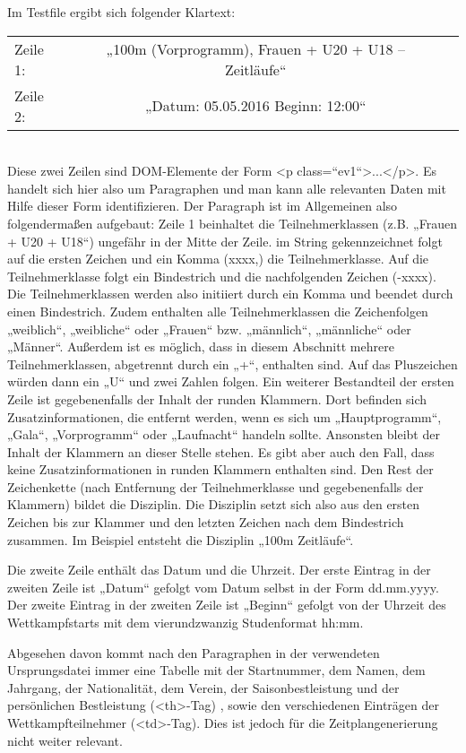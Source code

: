 {Im Testfile ergibt sich folgender Klartext:\\
\begin{tabular}{lcr}
Zeile 1: & „100m (Vorprogramm), Frauen + U20 + U18 – Zeitläufe“ \\
Zeile 2: & „Datum: 05.05.2016 Beginn: 12:00“ \\
\end{tabular} \\
Diese zwei Zeilen sind DOM-Elemente der Form <p class=“ev1“>...</p>. Es handelt sich hier also um Paragraphen und man kann alle relevanten Daten mit Hilfe dieser Form identifizieren.
Der Paragraph ist im Allgemeinen also folgendermaßen aufgebaut:
Zeile 1 beinhaltet die Teilnehmerklassen (z.B. „Frauen + U20 + U18“) ungefähr in der Mitte der Zeile. im String gekennzeichnet folgt auf die ersten Zeichen und ein Komma (xxxx,) die Teilnehmerklasse. Auf die Teilnehmerklasse folgt ein Bindestrich und die nachfolgenden Zeichen (-xxxx). Die Teilnehmerklassen werden also initiiert durch ein Komma und beendet durch einen Bindestrich. Zudem enthalten alle Teilnehmerklassen die Zeichenfolgen „weiblich“, „weibliche“ oder „Frauen“ bzw. „männlich“, „männliche“ oder „Männer“. Außerdem ist es möglich, dass in diesem Abschnitt mehrere Teilnehmerklassen, abgetrennt durch ein „+“, enthalten sind. Auf das Pluszeichen würden dann ein „U“ und zwei Zahlen folgen. Ein weiterer Bestandteil der ersten Zeile ist gegebenenfalls der Inhalt der runden Klammern. Dort befinden sich Zusatzinformationen, die entfernt werden, wenn es sich um „Hauptprogramm“, „Gala“, „Vorprogramm“ oder „Laufnacht“ handeln sollte. Ansonsten bleibt der Inhalt der Klammern an dieser Stelle stehen. Es gibt aber auch den Fall, dass keine Zusatzinformationen in runden Klammern enthalten sind. Den Rest der Zeichenkette (nach Entfernung der Teilnehmerklasse und gegebenenfalls der Klammern) bildet die Disziplin. Die Disziplin setzt sich also aus den ersten Zeichen bis zur Klammer und den letzten Zeichen nach dem Bindestrich zusammen. Im Beispiel entsteht die Disziplin „100m Zeitläufe“.

Die zweite Zeile enthält das Datum und die Uhrzeit. Der erste Eintrag in der zweiten Zeile ist „Datum“ gefolgt vom Datum selbst in der Form dd.mm.yyyy. Der zweite Eintrag in der zweiten Zeile ist „Beginn“ gefolgt von der Uhrzeit des Wettkampfstarts mit dem vierundzwanzig Studenformat hh:mm.

Abgesehen davon kommt nach den Paragraphen in der verwendeten Ursprungsdatei immer eine Tabelle mit der Startnummer, dem Namen, dem Jahrgang, der Nationalität, dem Verein, der Saisonbestleistung und der persönlichen Bestleistung (<th>-Tag) , sowie den verschiedenen Einträgen der Wettkampfteilnehmer (<td>-Tag). Dies ist jedoch für die Zeitplangenerierung nicht weiter relevant.

}
